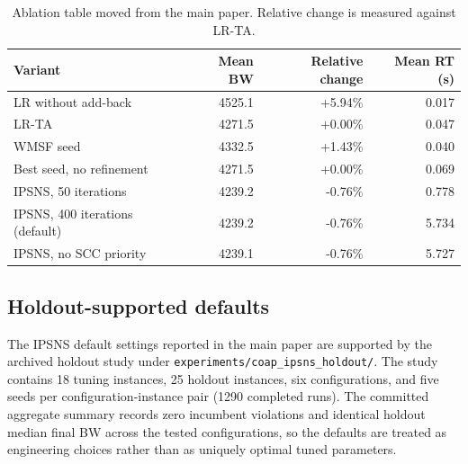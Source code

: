 \begin{table}[h]
\centering\small
\caption{Ablation table moved from the main paper. Relative change is measured against LR-TA.}
\begin{tabular}{lrrr}
\toprule
Variant & Mean BW & Relative change & Mean RT (s) \\
\midrule
LR without add-back & 4525.1 & +5.94\% & 0.017 \\
LR-TA & 4271.5 & +0.00\% & 0.047 \\
WMSF seed & 4332.5 & +1.43\% & 0.040 \\
Best seed, no refinement & 4271.5 & +0.00\% & 0.069 \\
IPSNS, 50 iterations & 4239.2 & -0.76\% & 0.778 \\
IPSNS, 400 iterations (default) & 4239.2 & -0.76\% & 5.734 \\
IPSNS, no SCC priority & 4239.1 & -0.76\% & 5.727 \\
\bottomrule
\end{tabular}
\end{table}

\subsection{Holdout-supported defaults}

The IPSNS default settings reported in the main paper are supported by the archived holdout study under \texttt{experiments/coap\_ipsns\_holdout/}. The study contains 18 tuning instances, 25 holdout instances, six configurations, and five seeds per configuration-instance pair (1290 completed runs). The committed aggregate summary records zero incumbent violations and identical holdout median final BW across the tested configurations, so the defaults are treated as engineering choices rather than as uniquely optimal tuned parameters.

